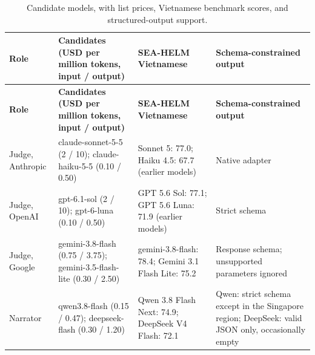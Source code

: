 {\small
\begin{longtable}{|>{\raggedright\arraybackslash}p{}|>{\raggedright\arraybackslash}p{}|>{\raggedright\arraybackslash}p{}|>{\raggedright\arraybackslash}p{}|}
\caption{Candidate models, with list prices, Vietnamese benchmark scores, and structured-output support.} \\
\hline
\textbf{Role} & \textbf{Candidates (USD per million tokens, input / output)} & \textbf{SEA-HELM Vietnamese} & \textbf{Schema-constrained output} \\ \hline
\endfirsthead
\hline
\textbf{Role} & \textbf{Candidates (USD per million tokens, input / output)} & \textbf{SEA-HELM Vietnamese} & \textbf{Schema-constrained output} \\ \hline
\endhead
Judge, Anthropic & claude-sonnet-5-5 (2 / 10); claude-haiku-5-5 (0.10 / 0.50) & Sonnet 5: 77.0; Haiku 4.5: 67.7 (earlier models) & Native adapter\cite{r195} \\ \hline
Judge, OpenAI & gpt-6.1-sol (2 / 10); gpt-6-luna (0.10 / 0.50) & GPT 5.6 Sol: 77.1; GPT 5.6 Luna: 71.9 (earlier models) & Strict schema \\ \hline
Judge, Google & gemini-3.8-flash (0.75 / 3.75); gemini-3.5-flash-lite (0.30 / 2.50) & gemini-3.8-flash: 78.4; Gemini 3.1 Flash Lite: 75.2 & Response schema; unsupported parameters ignored\cite{r196} \\ \hline
Narrator & qwen3.8-flash (0.15 / 0.47); deepseek-flash (0.30 / 1.20) & Qwen 3.8 Flash Next: 74.9; DeepSeek V4 Flash: 72.1 & Qwen: strict schema except in the Singapore region\cite{r200}; DeepSeek: valid JSON only, occasionally empty\cite{r201} \\ \hline
\end{longtable}
}

